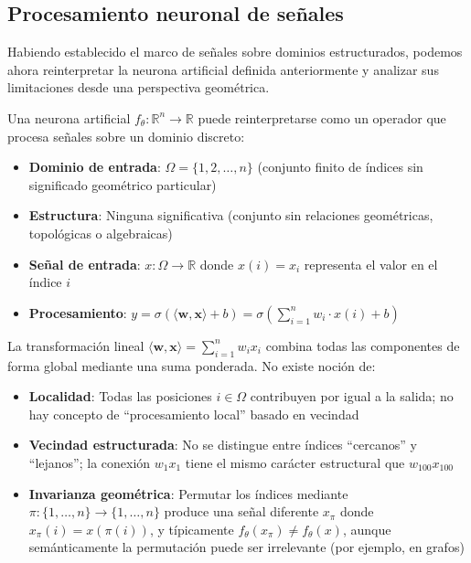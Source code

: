 \subsection{Procesamiento neuronal de señales}\label{sec:neurona_senales}

Habiendo establecido el marco de señales sobre dominios estructurados, podemos ahora reinterpretar la neurona artificial definida anteriormente y analizar sus limitaciones desde una perspectiva geométrica.

Una neurona artificial $f_\theta: \mathbb{R}^n \to \mathbb{R}$ puede reinterpretarse como un operador que procesa señales sobre un dominio discreto:

\begin{itemize}
	\item \textbf{Dominio de entrada}: $\Omega = \{1, 2, \ldots, n\}$ (conjunto finito de índices sin significado geométrico particular)
	\item \textbf{Estructura}: Ninguna significativa (conjunto sin relaciones geométricas, topológicas o algebraicas)
	\item \textbf{Señal de entrada}: $x: \Omega \to \mathbb{R}$ donde $x(i) = x_i$ representa el valor en el índice $i$
	\item \textbf{Procesamiento}: $y = \sigma(\langle \mathbf{w}, \mathbf{x} \rangle + b) = \sigma\left(\sum_{i=1}^n w_i \cdot x(i) + b\right)$
\end{itemize}

La transformación lineal $\langle \mathbf{w}, \mathbf{x} \rangle = \sum_{i=1}^n w_i x_i$ combina todas las componentes de forma global mediante una suma ponderada. No existe noción de:

\begin{itemize}
	\item \textbf{Localidad}: Todas las posiciones $i \in \Omega$ contribuyen por igual a la salida; no hay concepto de ``procesamiento local'' basado en vecindad

	\item \textbf{Vecindad estructurada}: No se distingue entre índices ``cercanos'' y ``lejanos''; la conexión $w_1 x_1$ tiene el mismo carácter estructural que $w_{100} x_{100}$

	\item \textbf{Invarianza geométrica}: Permutar los índices mediante $\pi: \{1,\ldots,n\} \to \{1,\ldots,n\}$ produce una señal diferente $x_\pi$ donde $x_\pi(i) = x(\pi(i))$, y típicamente $f_\theta(x_\pi) \neq f_\theta(x)$, aunque semánticamente la permutación puede ser irrelevante (por ejemplo, en grafos)
\end{itemize}

